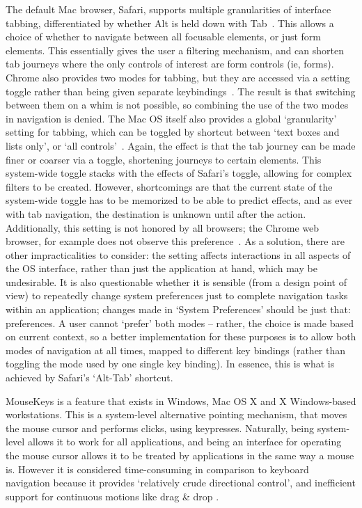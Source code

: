 \documentclass[11pt,openright,a4paper]{report}
\begin{document}
The default Mac browser, Safari, supports multiple granularities of interface tabbing, differentiated by whether Alt is held down with Tab~\cite{safaria11y}. This allows a choice of whether to navigate between all focusable elements, or just form elements. This essentially gives the user a filtering mechanism, and can shorten tab journeys where the only controls of interest are form controls (ie, forms). Chrome also provides two modes for tabbing, but they are accessed via a setting toggle rather than being given separate keybindings~\cite{browserkeyboardaccess}. The result is that switching between them on a whim is not possible, so combining the use of the two modes in navigation is denied.
The Mac OS itself also provides a global `granularity' setting for tabbing, which can be toggled by shortcut between `text boxes and lists only', or `all controls'~\cite{macshortcuts}. Again, the effect is that the tab journey can be made finer or coarser via a toggle, shortening journeys to certain elements. This system-wide toggle stacks with the effects of Safari's toggle, allowing for complex filters to be created. However, shortcomings are that the current state of the system-wide toggle has to be memorized to be able to predict effects, and as ever with tab navigation, the destination is unknown until after the action. Additionally, this setting is not honored by all browsers; the Chrome web browser, for example does not observe this preference~\cite{browserkeyboardaccess}.
As a solution, there are other impracticalities to consider: the setting affects interactions in all aspects of the OS interface, rather than just the application at hand, which may be undesirable. It is also questionable whether it is sensible (from a design point of view) to repeatedly change system preferences just to complete navigation tasks within an application; changes made in `System Preferences' should be just that: preferences. A user cannot `prefer' both modes -- rather, the choice is made based on current context, so a better implementation for these purposes is to allow both modes of navigation at all times, mapped to different key bindings (rather than toggling the mode used by one single key binding). In essence, this is what is achieved by Safari's `Alt-Tab' shortcut.

MouseKeys is a feature that exists in Windows, Mac OS X and X Windows-based workstations. This is a system-level alternative pointing mechanism, that moves the mouse cursor and performs clicks, using keypresses. Naturally, being system-level allows it to work for all applications, and being an interface for operating the mouse cursor allows it to be treated by applications in the same way a mouse is. However it is considered time-consuming in comparison to keyboard navigation because it provides `relatively crude directional control', and inefficient support for continuous motions like drag \& drop \cite{bergman1995towards}.
\end{document}
